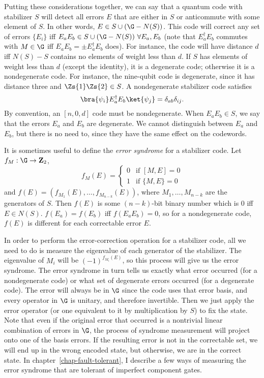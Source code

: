 Putting these considerations together, we can say that a quantum code
with stabilizer $S$ will detect all errors $E$ that are either in $S$ or
anticommute with some element of $S$.  In other words, $E \in S \cup (\G -
N(S))$.  This code will correct any set of errors $\{ E_i \}$ iff $E_a E_b \in
S \cup (\G - N(S)) \ \forall E_a, E_b$ (note that $E_a^\dagger E_b$ commutes
with $M \in \G$ iff $E_a E_b = \pm E_a^\dagger E_b$ does).  For instance, the
code will have distance $d$ iff $N(S) - S$ contains no elements of weight less
than $d$.  If $S$ has elements of weight less than $d$ (except the identity),
it is a degenerate code; otherwise it is a nondegenerate code.  For instance,
the nine-qubit code is degenerate, since it has distance three and $\Zs{1}
\Zs{2} \in S$.  A nondegenerate stabilizer code satisfies
\begin{equation}
	\bra{\psi_i} E_a^\dagger E_b \ket{\psi_j} = \delta_{ab} \delta_{ij}.
\end{equation}
By convention, an $[n, 0, d]$ code must be nondegenerate.  When $E_a E_b \in S$,
we say that the errors $E_a$ and $E_b$ are degenerate.  We cannot distinguish
between $E_a$ and $E_b$, but there is no need to, since they have the same
effect on the codewords.

It is sometimes useful to define the {\em error syndrome} for a stabilizer
code.  Let $f_M : \G \rightarrow {\bf Z}_2$,
\begin{equation}
	f_M (E) = \left\{ \begin{array}{ll} 0 & \mbox{if $[M, E] = 0$} \\ 1 &
	\mbox{if $\{M, E\} = 0$} \end{array} \right.
\end{equation}
and $f (E) = (f_{M_1} (E), \ldots, f_{M_{n-k}} (E) )$, where $M_1, \ldots,
M_{n-k}$ are the generators of $S$.  Then $f(E)$ is some $(n-k)$-bit binary
number which is $0$ iff $E \in N(S)$.  $f(E_a) = f(E_b)$ iff $f(E_a E_b) = 0$,
so for a nondegenerate code, $f(E)$ is different for each correctable error
$E$.

In order to perform the error-correction operation for a stabilizer code, all
we need to do is measure the eigenvalue of each generator of the
stabilizer.  The eigenvalue of $M_i$ will be $(-1)^{f_{M_i} (E)}$, so this
process will give us the error syndrome.  The error syndrome in turn tells
us exactly what error occurred (for a nondegenerate code) or what set of
degenerate errors occurred (for a degenerate code).  The error will always be
in $\G$ since the code uses that error basis, and every operator in $\G$ is
unitary, and therefore invertible.  Then we just apply the error operator (or
one equivalent to it by multiplication by $S$) to fix the state.  Note that
even if the original error that occurred is a nontrivial linear combination of
errors in $\G$, the process of syndrome measurement will project onto one
of the basis errors.  If the resulting error is not in the correctable set,
we will end up in the wrong encoded state, but otherwise, we are in the
correct state.  In chapter~\ref{chap-fault-tolerant}, I describe a few ways
of measuring the error syndrome that are tolerant of imperfect component gates.

